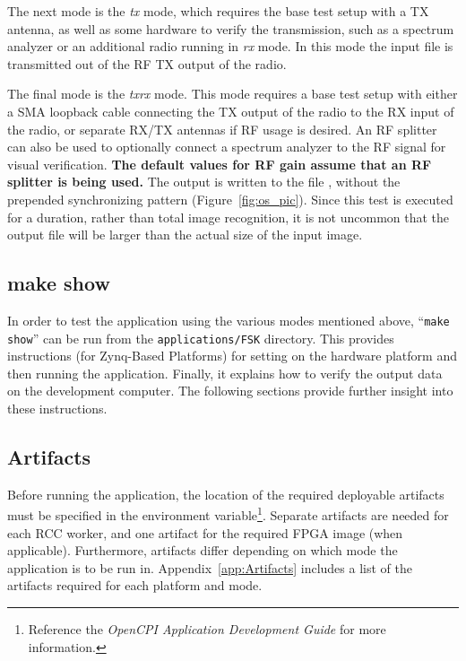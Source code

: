 The next mode is the \textit{tx} mode, which requires the base test setup with a TX antenna, as well as some hardware to verify the transmission, such as a spectrum analyzer or an additional radio running in \textit{rx} mode. In this mode the input file  is transmitted out of the RF TX output of the radio.\par\medskip
The final mode is the \textit{txrx} mode. This mode requires a base test setup with either a SMA loopback cable connecting the TX output of the radio to the RX input of the radio, or separate RX/TX antennas if RF usage is desired. An RF splitter can also be used to optionally connect a spectrum analyzer to the RF signal for visual verification. \textbf{The default values for RF gain assume that an RF splitter is being used.} The output is written to the file , without the prepended synchronizing pattern (Figure~\ref{fig:os_pic}). Since this test is executed for a duration, rather than total image recognition, it is not uncommon that the output file will be larger than the actual size of the input image.
\par\medskip
\subsection{make show}
In order to test the application using the various modes mentioned above, ``\texttt{make show}'' can be run from the \texttt{applications/FSK} directory. This provides instructions (for Zynq-Based Platforms) for setting  on the hardware platform and then running the application. Finally, it explains how to verify the output data on the development computer. The following sections provide further insight into these instructions.
\subsection{Artifacts}
Before running the application, the location of the required deployable artifacts must be specified in the  environment variable\footnote{Reference the \textit{OpenCPI Application Development Guide} for more information.}.
Separate artifacts are needed for each RCC worker, and one artifact for the required FPGA image (when applicable).
Furthermore, artifacts differ depending on which mode the application is to be run in.
Appendix~\ref{app:Artifacts} includes a list of the artifacts required for each platform and mode.\\

